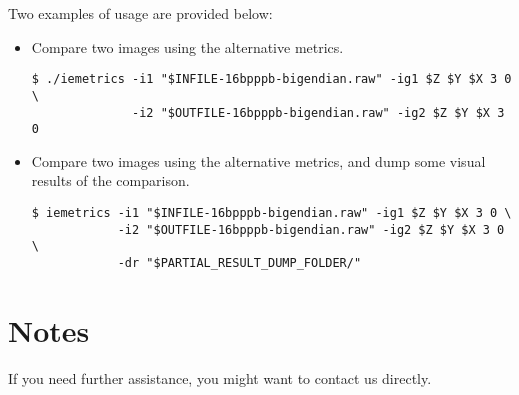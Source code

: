 \documentclass[a4paper,10pt]{article}
\begin{document}
Two examples of usage are provided below:

\begin{itemize}
\item Compare two images using the alternative metrics.
\begin{framed}%
\vspace{-1em}%
\begin{verbatim}
$ ./iemetrics -i1 "$INFILE-16bpppb-bigendian.raw" -ig1 $Z $Y $X 3 0 \
              -i2 "$OUTFILE-16bpppb-bigendian.raw" -ig2 $Z $Y $X 3 0
\end{verbatim}%
\vspace{-1em}%
\end{framed}

\item Compare two images using the alternative metrics, and dump some visual results of the comparison.
\begin{framed}%
\vspace{-1em}%
\begin{verbatim}
$ iemetrics -i1 "$INFILE-16bpppb-bigendian.raw" -ig1 $Z $Y $X 3 0 \
            -i2 "$OUTFILE-16bpppb-bigendian.raw" -ig2 $Z $Y $X 3 0 \
            -dr "$PARTIAL_RESULT_DUMP_FOLDER/"
\end{verbatim}%
\vspace{-1em}%
\end{framed}
\end{itemize}

\section{Notes}

If you need further assistance, you might want to contact us directly.



\end{document}
